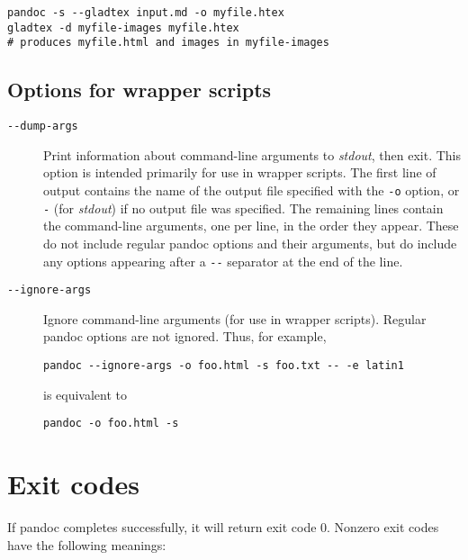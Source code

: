 \documentclass[]{article}
\begin{document}
\begin{description}
\begin{verbatim}
pandoc -s --gladtex input.md -o myfile.htex
gladtex -d myfile-images myfile.htex
# produces myfile.html and images in myfile-images
\end{verbatim}
\end{description}

\hypertarget{options-for-wrapper-scripts}{%
\subsection{Options for wrapper
scripts}\label{options-for-wrapper-scripts}}

\begin{description}
\item[\texttt{-\/-dump-args}]
Print information about command-line arguments to \emph{stdout}, then
exit. This option is intended primarily for use in wrapper scripts. The
first line of output contains the name of the output file specified with
the \texttt{-o} option, or \texttt{-} (for \emph{stdout}) if no output
file was specified. The remaining lines contain the command-line
arguments, one per line, in the order they appear. These do not include
regular pandoc options and their arguments, but do include any options
appearing after a \texttt{-\/-} separator at the end of the line.
\item[\texttt{-\/-ignore-args}]
Ignore command-line arguments (for use in wrapper scripts). Regular
pandoc options are not ignored. Thus, for example,

\begin{verbatim}
pandoc --ignore-args -o foo.html -s foo.txt -- -e latin1
\end{verbatim}

is equivalent to

\begin{verbatim}
pandoc -o foo.html -s
\end{verbatim}
\end{description}

\hypertarget{exit-codes}{%
\section{Exit codes}\label{exit-codes}}

If pandoc completes successfully, it will return exit code 0. Nonzero
exit codes have the following meanings:
\end{document}
